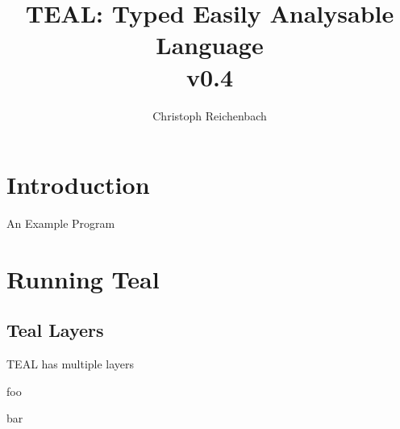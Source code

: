\documentclass{article}
\title{TEAL: Typed Easily Analysable Language\\
  \normalsize v0.4}
\author{Christoph Reichenbach}
\newenvironment{TEALone}[1]{\begin{TEALoneBOX}#1}{\end{TEALoneBOX}}
\newenvironment{TEALtwo}[1]{\begin{TEALtwoBOX}#1}{\end{TEALtwoBOX}}
\newenvironment{TEALthree}[1]{\begin{TEALthreeBOX}#1}{\end{TEALthreeBOX}}
\begin{document}
\maketitle

\section{Introduction}

An Example Program

\section{Running Teal}

\begin{TEALone}
\section{Teal Layers}

  TEAL has multiple layers

\begin{TEALtwo}
    foo
\end{TEALtwo}
\begin{TEALthree}
    bar
\end{TEALthree}

\end{TEALone}


\end{document}
